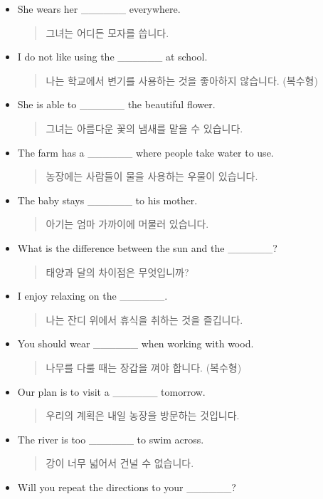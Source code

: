 \documentclass{article}
\begin{document}
\begin{addmargin}[1em]{1em}
\begin{itemize}
    \item She wears her \_\_\_\_\_\_ everywhere.
    \begin{quote}
    그녀는 어디든 모자를 씁니다.
    \end{quote}
    \item I do not like using the \_\_\_\_\_\_ at school.
    \begin{quote}
    나는 학교에서 변기를 사용하는 것을 좋아하지 않습니다. (복수형)
    \end{quote}
    \item She is able to \_\_\_\_\_\_ the beautiful flower.
    \begin{quote}
    그녀는 아름다운 꽃의 냄새를 맡을 수 있습니다.
    \end{quote}
    \item The farm has a \_\_\_\_\_\_ where people take water to use.
    \begin{quote}
    농장에는 사람들이 물을 사용하는 우물이 있습니다.
    \end{quote}
    \item The baby stays \_\_\_\_\_\_ to his mother.
    \begin{quote}
    아기는 엄마 가까이에 머물러 있습니다.
    \end{quote}
    \item What is the difference between the sun and the \_\_\_\_\_\_?
    \begin{quote}
    태양과 달의 차이점은 무엇입니까?
    \end{quote}
    \item I enjoy relaxing on the \_\_\_\_\_\_.
    \begin{quote}
    나는 잔디 위에서 휴식을 취하는 것을 즐깁니다.
    \end{quote}
    \item You should wear \_\_\_\_\_\_ when working with wood.
    \begin{quote}
    나무를 다룰 때는 장갑을 껴야 합니다. (복수형)
    \end{quote}
    \item Our plan is to visit a \_\_\_\_\_\_ tomorrow.
    \begin{quote}
    우리의 계획은 내일 농장을 방문하는 것입니다.
    \end{quote}
    \item The river is too \_\_\_\_\_\_ to swim across.
    \begin{quote}
    강이 너무 넓어서 건널 수 없습니다.
    \end{quote}
    \item Will you repeat the directions to your \_\_\_\_\_\_?

\end{itemize}
\end{addmargin}
\end{document}
